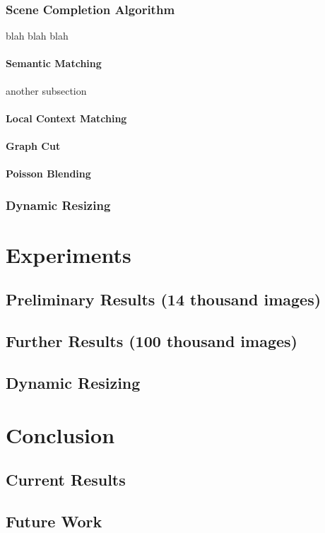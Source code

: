 \documentclass[11pt]{amsart}
\begin{document}
\subsubsection{Scene Completion Algorithm}
blah blah blah

\paragraph{\sc Semantic Matching} 
another subsection

\paragraph{\sc Local Context Matching}

\paragraph{\sc Graph Cut}

\paragraph{\sc Poisson Blending}

\subsubsection{Dynamic Resizing}

\section{Experiments}

\subsection{Preliminary Results (14 thousand images)}

\subsection{Further Results (100 thousand images)} 

\subsection{Dynamic Resizing}

\section{Conclusion}

\subsection{Current Results}

\subsection{Future Work}



\end{document}
